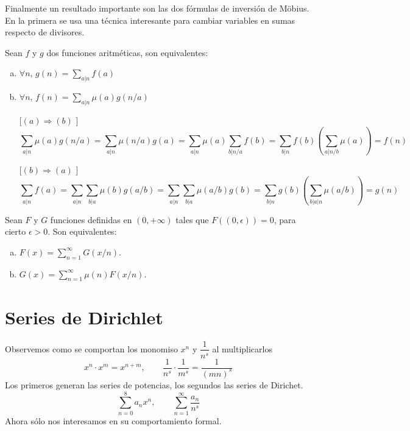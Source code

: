 \documentclass[TAN.tex]{subfiles}
\begin{document}
Finalmente un resultado importante son las dos fórmulas de inversión de Möbius.
En la primera se usa una técnica interesante para cambiar variables en sumas respecto de divisores.

\begin{prop}
Sean $f$ y $g$ dos funciones aritméticas, son equivalentes:
\begin{enumerate}[(a)]
	\item $\forall n$, $g(n) = \sum_{a|n} f(a)$
	\item $\forall n$, $f(n) = \sum_{a|n}μ(a) g(n/a)$
\end{enumerate}
\end{prop}
\begin{dem}\mbox{}
\begin{itemize}
	\item[[$(a) \Rightarrow (b)$]]
	\[
	\sum_{a|n} μ(a)g(n/a) = \sum_{a|n}μ(n/a)g(a) = \sum_{a|n}μ(a) \sum_{b|n/a} f(b) = \sum_{b|n}f(b)\left(\sum_{a|n/b} μ(a)\right) = f(n)
	\]
	\item[[$(b) \Rightarrow (a)$]]
	\[
	\sum_{a|n}f(a) = \sum_{a|n} \sum_{b|a} μ(b)g(a/b) = \sum_{a|n}\sum_{b|a} μ(a/b)g(b) = \sum_{b|n}g(b)\left(\sum_{b|a|n}μ(a/b)\right) = g(n)
	\]
\end{itemize}
\end{dem}

\begin{prop}
Sean $F$ y $G$ funciones definidas en $(0,+∞)$ tales que $F((0,ϵ))=0$, para cierto $ϵ > 0$. Son equivalentes:
\begin{enumerate}[(a)]
\item $F(x) = \sum_{n=1}^{∞} G(x/n)$.
\item $G(x) = \sum_{n=1}^{∞} μ(n) F(x/n)$.
\end{enumerate}
\end{prop}


\section{Series de Dirichlet}

Observemos como se comportan los monomiso $x^n$ y $\dfrac{1}{n^s}$ al multiplicarlos
\[ x^n \cdot x^m = x^{n+m}, \qquad \frac{1}{n^s} \cdot \frac{1}{m^s} = \frac{1}{(mn)^s} \]
Los primeros generan las series de potencias, los segundos las series de Dirichet.
\[ \sum_{n=0}^{8} a_n x^n, \qquad \sum_{n=1}^{∞} \frac{a_n}{n^s} \]
Ahora sólo nos interesamos en su comportamiento formal.
\end{document}
